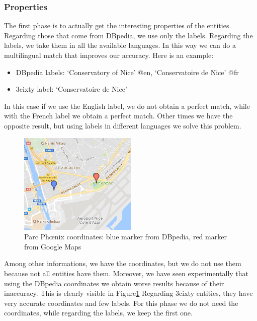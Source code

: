 \documentclass[paper=a4, fontsize=11pt]{scrartcl}
\begin{document}
\subsubsection{Properties}
The first phase is to actually get the interesting properties of the entities. Regarding those that come from DBpedia, we use only the labels. Regarding the labels, we take them in all the available languages. In this way we can do a multilingual match that improves our accuracy.
Here is an example:
\begin{itemize}
\item DBpedia labels: `Conservatory of Nice' @en, `Conservatoire de Nice' @fr
\item 3cixty label: `Conservatoire de Nice'
\end{itemize}
In this case if we use the English label, we do not obtain a perfect match, while with the French label we obtain a perfect match. Other times we have the opposite result, but using labels in different languages we solve this problem.

\begin{figure}[!htb]
  \centering
    \includegraphics[width=0.5\textwidth]{images/parc.png}
    \caption{Parc Phœnix coordinates: blue marker from DBpedia, red marker from Google Maps}
    \label{fig:parc}
\end{figure}

Among other informations, we have the coordinates, but we do not use them because not all entities have them. Moreover, we have seen experimentally that using the DBpedia coordinates we obtain worse results because of their inaccuracy. This is clearly visible in Figure\ref{fig:parc}
Regarding 3cixty entities, they have very accurate coordinates and few labels. For this phase we do not need the coordinates, while regarding the labels, we keep the first one.
\end{document}
